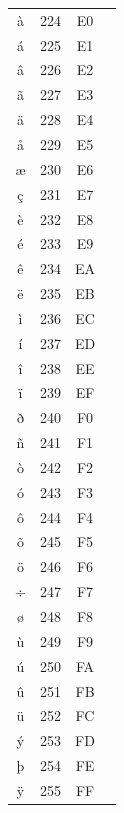 ﻿\documentclass[10pt]{article}
\begin{document}
\begin{tabular}{crcl}
à&224&E0&\\
á&225&E1&\\
â&226&E2&\\
ã&227&E3&\\
ä&228&E4&\\
å&229&E5&\\
æ&230&E6&\\
ç&231&E7&\\
è&232&E8&\\
é&233&E9&\\
ê&234&EA&\\
ë&235&EB&\\
ì&236&EC&\\
í&237&ED&\\
î&238&EE&\\
ï&239&EF&\\
ð&240&F0&\\
ñ&241&F1&\\
ò&242&F2&\\
ó&243&F3&\\
ô&244&F4&\\
õ&245&F5&\\
ö&246&F6&\\
÷&247&F7&\\
ø&248&F8&\\
ù&249&F9&\\
ú&250&FA&\\
û&251&FB&\\
ü&252&FC&\\
ý&253&FD&\\
þ&254&FE&\\
ÿ&255&FF&\\
\end{tabular}
\end{document}
